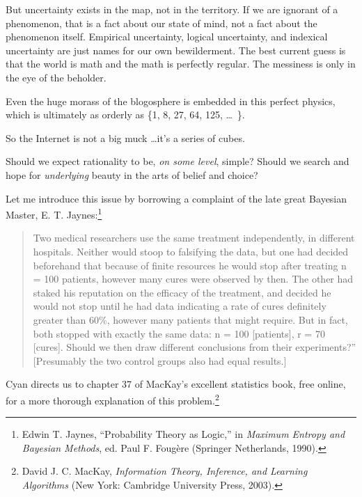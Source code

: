 {
 But uncertainty exists in the map, not in the territory. If we are
ignorant of a phenomenon, that is a fact about our state of mind, not a
fact about the phenomenon itself. Empirical uncertainty, logical
uncertainty, and indexical uncertainty are just names for our own
bewilderment. The best current guess is that the world is math and the
math is perfectly regular. The messiness is only in the eye of the
beholder.}

{
 Even the huge morass of the blogosphere is embedded in this
perfect physics, which is ultimately as orderly as
\{1, 8, 27, 64, 125,
\ldots~\}.}

{
 So the Internet is not a big muck \ldots it's a
series of cubes.}

\myendsectiontext


{
 Should we expect rationality to be, \textit{on some level},
simple? Should we search and hope for \textit{underlying} beauty in the
arts of belief and choice? }

{
 Let me introduce this issue by borrowing a complaint of the late
great Bayesian Master, E. T. Jaynes:\footnote{Edwin T. Jaynes, ``Probability Theory as
Logic,'' in \textit{Maximum Entropy and Bayesian
Methods}, ed. Paul F. Fougère (Springer Netherlands, 1990).}}

\begin{quote}
{
 Two medical researchers use the same treatment independently, in
different hospitals. Neither would stoop to falsifying the data, but
one had decided beforehand that because of finite resources he would
stop after treating n = 100 patients, however many cures were observed
by then. The other had staked his reputation on the efficacy of the
treatment, and decided he would not stop until he had data indicating a
rate of cures definitely greater than 60\%, however many patients that
might require. But in fact, both stopped with exactly the same data: n
= 100 [patients], r = 70 [cures]. Should we then draw different
conclusions from their experiments?'' [Presumably the
  two control groups also had equal results.]}
\end{quote}

{
 Cyan directs us to chapter 37 of MacKay's
excellent statistics book, free online, for a more thorough explanation
of this problem.\footnote{David J. C. MacKay, \textit{Information Theory, Inference, and
Learning Algorithms} (New York: Cambridge University Press, 2003).}}

